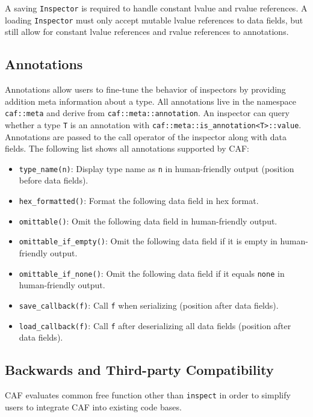 A saving \lstinline^Inspector^ is required to handle constant lvalue and rvalue
references. A loading \lstinline^Inspector^ must only accept mutable lvalue
references to data fields, but still allow for constant lvalue references and
rvalue references to annotations.

\subsection{Annotations}

Annotations allow users to fine-tune the behavior of inspectors by providing
addition meta information about a type. All annotations live in the namespace
\lstinline^caf::meta^ and derive from \lstinline^caf::meta::annotation^. An
inspector can query whether a type \lstinline^T^ is an annotation with
\lstinline^caf::meta::is_annotation<T>::value^. Annotations are passed to the
call operator of the inspector along with data fields. The following list shows
all annotations supported by CAF:

\begin{itemize}
\item \lstinline^type_name(n)^: Display type name as \lstinline^n^ in
  human-friendly output (position before data fields).
\item \lstinline^hex_formatted()^: Format the following data field in hex
  format.
\item \lstinline^omittable()^: Omit the following data field in human-friendly
  output.
\item \lstinline^omittable_if_empty()^: Omit the following data field if it is
  empty in human-friendly output.
\item \lstinline^omittable_if_none()^: Omit the following data field if it
  equals \lstinline^none^ in human-friendly output.
\item \lstinline^save_callback(f)^: Call \lstinline^f^ when serializing
  (position after data fields).
\item \lstinline^load_callback(f)^: Call \lstinline^f^ after deserializing all
  data fields (position after data fields).
\end{itemize}

\subsection{Backwards and Third-party Compatibility}

CAF evaluates common free function other than \lstinline^inspect^ in order to
simplify users to integrate CAF into existing code bases.

